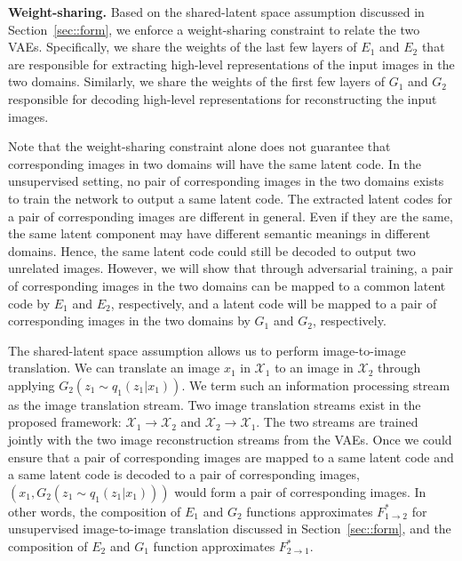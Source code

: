 \documentclass{article}
\begin{document}
{\bf Weight-sharing.} Based on the shared-latent space assumption discussed in Section~\ref{sec::form}, we enforce a weight-sharing constraint to relate the two VAEs. Specifically, we share the weights of the last few layers of $E_1$ and $E_2$ that are responsible for extracting high-level representations of the input images in the two domains. Similarly, we share the weights of the first few layers of $G_1$ and $G_2$ responsible for decoding high-level representations for reconstructing the input images.


Note that the weight-sharing constraint alone does not guarantee that corresponding images in two domains will have the same latent code. In the unsupervised setting, no pair of corresponding images in the two domains exists to train the network to output a same latent code. The extracted latent codes for a pair of corresponding images are different in general. Even if they are the same, the same latent component may have different semantic meanings in different domains. Hence, the same latent code could still be decoded to output two unrelated images. However, we will show that through adversarial training, a pair of corresponding images in the two domains can be mapped to a common latent code by $E_1$ and $E_2$, respectively, and a latent code will be mapped to a pair of corresponding images in the two domains by $G_1$ and $G_2$, respectively.  


The shared-latent space assumption allows us to perform image-to-image translation. We can translate an image $x_1$ in $\mathcal{X}_1$ to an image in $\mathcal{X}_2$ through applying $G_2 (z_1 \sim q_1 (z_1|x_1))$. We term such an information processing stream as the image translation stream. Two image translation streams exist in the proposed framework: $\mathcal{X}_1 \rightarrow \mathcal{X}_2$ and $\mathcal{X}_2 \rightarrow \mathcal{X}_1$. The two streams are trained jointly with the two image reconstruction streams from the VAEs. Once we could ensure that a pair of corresponding images are mapped to a same latent code and a same latent code is decoded to a pair of corresponding images, $(x_1, G_2 (z_1 \sim q_1 (z_1|x_1)) )$ would form a pair of corresponding images. In other words, the composition of $E_1$ and $G_2$ functions approximates $F^{*}_{1\rightarrow 2}$ for unsupervised image-to-image translation discussed in Section~\ref{sec::form}, and the composition of $E_2$ and $G_1$ function approximates $F^{*}_{2\rightarrow 1}$.
\end{document}
